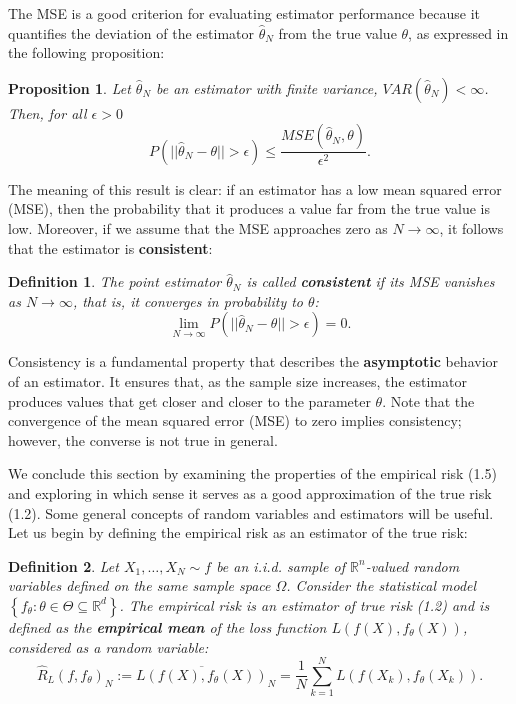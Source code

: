 \documentclass{report}
\newtheorem{definition}{Definition}[chapter]
\newtheorem{proposition}{Proposition}[chapter]
\begin{document}
The MSE is a good criterion for evaluating estimator performance because it quantifies the deviation of the estimator $\hat{\theta}_N$ from the true value $\theta$, as expressed in the following proposition:

\begin{proposition}
Let $\hat{\theta}_N$ be an estimator with finite variance, $VAR(\hat{\theta}_N) < \infty$. Then, for all $\epsilon > 0$
\begin{equation}
P(||\hat{\theta}_N -\theta|| > \epsilon) \leq \frac{MSE(\hat{\theta}_N,\theta)}{\epsilon ^ 2}.
\end{equation}
\end{proposition}

The meaning of this result is clear: if an estimator has a low mean squared error (MSE), then the probability that it produces a value far from the true value is low. Moreover, if we assume that the MSE approaches zero as $N \to \infty$, it follows that the estimator is \textbf{consistent}:

\begin{definition}
The point estimator $\hat{\theta}_N$ is called \textbf{consistent} if its MSE vanishes as $N \to \infty$, that is, it converges in probability to $\theta$:
\begin{equation}
\lim_{N \to \infty} P(||\hat{\theta}_N -\theta|| > \epsilon) = 0.
\end{equation}
\end{definition}

Consistency is a fundamental property that describes the \textbf{asymptotic} behavior of an estimator. It ensures that, as the sample size increases, the estimator produces values that get closer and closer to the parameter $\theta$. Note that the convergence of the mean squared error (MSE) to zero implies consistency; however, the converse is not true in general.

We conclude this section by examining the properties of the empirical risk (1.5) and exploring in which sense it serves as a good approximation of the true risk (1.2). Some general concepts of random variables and estimators will be useful. Let us begin by defining the empirical risk as an estimator of the true risk:

\begin{definition}
Let $X_1,\dots,X_N \sim f$ be an i.i.d. sample of $\mathbb{R}^n$-valued random variables defined on the same sample space $\Omega$. Consider the statistical model $\left\{f_\theta : \theta \in \Theta \subseteq \mathbb{R}^d\right\}$. The empirical risk is an estimator of true risk (1.2) and is defined as the \textbf{empirical mean} of the loss function $L(f(X), f_\theta(X))$, considered as a random variable:
\begin{equation}
\hat{R}_L(f,f_\theta)_N := \overline{L(f(X),f_\theta(X))}_N = \frac{1}{N}\sum_{k=1}^{N}L(f(X_k),f_\theta(X_k)).
\end{equation}
\end{definition}
\end{document}

